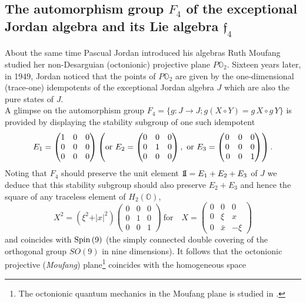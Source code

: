 \documentclass{article}
\newcommand{\be}{\begin{equation}}
\newcommand{\ee}{\end{equation}}
\def\un{{\rm 1\mkern-4mu I}}
\begin{document}
\subsection{The automorphism group $F_4$ of the exceptional Jordan algebra and its Lie algebra ${\mathfrak f}_4$}

About the same time Pascual Jordan introduced his algebras Ruth Moufang studied her non-Desarguian (octonionic) projective plane $P{\mathbb O}_2$. Sixteen years later, in 1949, Jordan noticed that the points of $P{\mathbb O}_2$ are given by the one-dimensional (trace-one) idempotents of the exceptional Jordan algebra $J$ which are also the pure states of $J$.\\
A glimpse on the automorphism group  $F_4 = \{ g : J \to J ; g(X \circ Y) = g \, X \circ g \, Y \}$ is provided by displaying the stability subgroup of one such idempotent
\be
\label{eq31}
E_1 = \begin{pmatrix}
1 &0 &0 \\
0 &0 &0 \\
0 &0 &0 \end{pmatrix} \left( {\rm or} \ E_2 = \begin{pmatrix}
0 &0 &0 \\
0 &1 &0 \\
0 &0 &0 \end{pmatrix} , \ {\rm or} \ E_3 = \begin{pmatrix}
0 &0 &0 \\
0 &0 &0 \\ \, 
0 &0 &1 \end{pmatrix} \right).
\ee
Noting that $F_4$ should preserve the unit element $\un = E_1 + E_2 + E_3$ of $J$ we deduce that this stability subgroup should also preserve $E_2 + E_3$ and hence the square of any traceless element of $H_2 ({\mathbb O})$,
\be
\label{eq32}
X^2 = (\xi^2 + \vert x \vert^2) \begin{pmatrix}
0 &0 &0 \\
0 &1 &0 \\
0 &0 &1 \end{pmatrix} \ \mbox{for} \quad X = \begin{pmatrix}
0 &0 &0 \\
0 &\xi &x \\
0 &\bar x &-\xi \end{pmatrix}
\ee
and coincides with ${\rm Spin} \, (9)$ (the simply connected double covering of the orthogonal group $SO (9)$ in nine dimensions). It follows that the octonionic projective (\textit{Moufang}) plane\footnote{The octonionic quantum mechanics in the Moufang plane is studied in \cite{GPR}.} coincides with the homogeneous space
\end{document}
